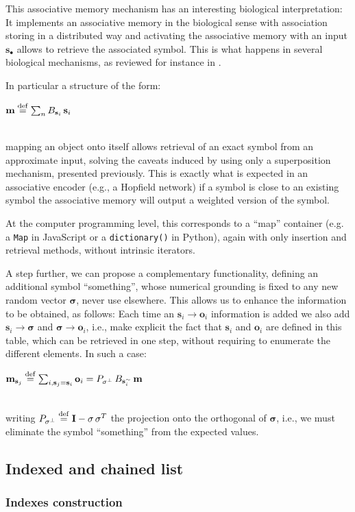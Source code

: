 \documentclass[sn-mathphys]{sn-jnl}
\newcommand{\defq}{\stackrel {\rm def}{=}}
\newcommand{\eqline}[1]{~\vspace{0.1cm}\\\centerline{$#1$}\vspace{0.1cm}\\}
\begin{document}
\begin{appendices}
This associative memory mechanism has an interesting biological interpretation: It implements an associative memory in the biological sense with association storing in a distributed way and activating the associative memory with an input $\mathbf{s}_\bullet$ allows to retrieve the associated symbol. This is what happens in several biological mechanisms, as reviewed for instance in \cite{eichenbaum_memory_2017}. 

In particular a structure of the form:
\eqline{\mathbf{m} \defq \sum_n B_{\mathbf{s}_i} \, \mathbf{s}_i}
mapping an object onto itself allows retrieval of an exact symbol from an approximate input, solving the caveats induced by using only a superposition mechanism, presented previously. This is exactly what is expected in an associative encoder (e.g., a Hopfield network) if a symbol is close to an existing symbol the associative memory will output a weighted version of the symbol.

At the computer programming level, this corresponds to a ``map'' container (e.g. a {\tt Map} in JavaScript or a {\tt dictionary()} in Python), again with only insertion and retrieval methods, without intrinsic iterators.

A step further, we can propose a complementary functionality, defining an additional symbol ``something'', whose numerical grounding is fixed to any new random vector $\mathbf{\sigma}$, never use elsewhere. This allows us to enhance the information to be obtained, as follows: Each time an $\mathbf{s}_i \rightarrow \mathbf{o}_i$ information is added we also add $\mathbf{s}_i \rightarrow \mathbf{\sigma}$  and $\mathbf{\sigma} \rightarrow \mathbf{o}_i$, i.e., make explicit the fact that $\mathbf{s}_i$ and $\mathbf{o}_i$ are defined in this table, which can be retrieved in one step, without requiring to enumerate the different elements. In such a case:
\eqline{\mathbf{m}_{\mathbf{s}_j} \defq \sum_{i, \mathbf{s}_j = \mathbf{s}_i} \mathbf{o}_i = P_{\mathbf{\sigma}^\perp} \,  B_{\mathbf{s}_i^\sim} \, \mathbf{m}}
writing $P_{\mathbf{\sigma}^\perp} \defq \mathbf{I} - \mathbf{\sigma} \, \mathbf{\sigma}^T$ the projection onto the orthogonal of $\mathbf{\sigma}$, i.e., we must eliminate the symbol ``something'' from the expected values.

\subsection{Indexed and chained list}

\subsubsection{Indexes construction}


\end{appendices}
\end{document}
